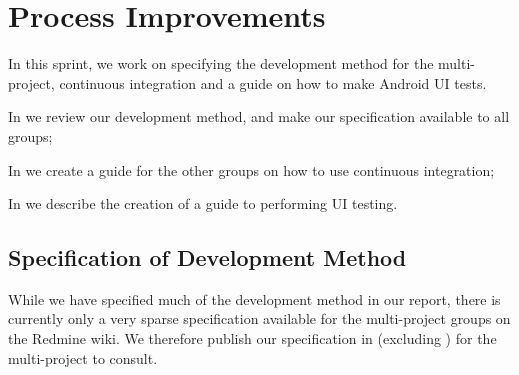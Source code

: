 \chapter{Process Improvements}\label{sec:process_improvements}
In this sprint, we work on specifying the development method for the multi-project, continuous integration and a guide on how to make Android UI tests.

\begin{chapterorganization}
  \item In  we review our development method, and make our specification available to all groups;
  \item In  we create a guide for the other groups on how to use continuous integration;
  \item In  we describe the creation of a guide to performing UI testing.
\end{chapterorganization}

\section{Specification of Development Method}\label{sec:processspecs}
While we have specified much of the development method in our report, there is currently only a very sparse specification available for the multi-project groups on the Redmine wiki. We therefore publish our specification in  (excluding ) for the multi-project to consult.


